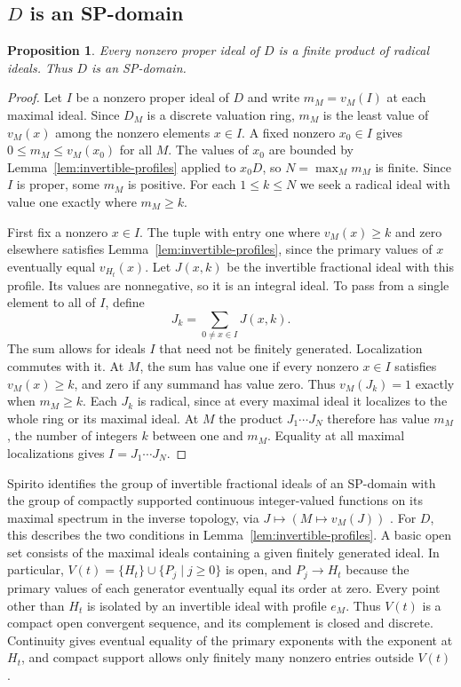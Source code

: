 \documentclass{article}
\newtheorem{proposition}{Proposition}[section]
\theoremstyle{remark}
\begin{document}
\subsection{$D$ is an SP-domain}

\begin{proposition}
    \label{prop:sp-domain}
    Every nonzero proper ideal of $D$ is a finite product of radical ideals.
    Thus $D$ is an SP-domain.
\end{proposition}

\begin{proof}
    Let $I$ be a nonzero proper ideal of $D$ and write $m_M = v_M(I)$ at each maximal ideal.
    Since $D_M$ is a discrete valuation ring, $m_M$ is the least value of $v_M(x)$ among the nonzero elements $x \in I$.
    A fixed nonzero $x_0 \in I$ gives $0 \le m_M \le v_M(x_0)$ for all $M$.
    The values of $x_0$ are bounded by Lemma~\ref{lem:invertible-profiles} applied to $x_0D$, so $N = \max_M m_M$ is finite.
    Since $I$ is proper, some $m_M$ is positive.
    For each $1 \le k \le N$ we seek a radical ideal with value one exactly where $m_M \ge k$.

    First fix a nonzero $x \in I$.
    The tuple with entry one where $v_M(x) \ge k$ and zero elsewhere satisfies Lemma~\ref{lem:invertible-profiles}, since the primary values of $x$ eventually equal $v_{H_t}(x)$.
    Let $J(x, k)$ be the invertible fractional ideal with this profile.
    Its values are nonnegative, so it is an integral ideal.
    To pass from a single element to all of $I$, define
    \[
        J_k = \sum_{0 \ne x \in I} J(x, k).
    \]
    The sum allows for ideals $I$ that need not be finitely generated.
    Localization commutes with it.
    At $M$, the sum has value one if every nonzero $x \in I$ satisfies $v_M(x) \ge k$, and zero if any summand has value zero.
    Thus $v_M(J_k) = 1$ exactly when $m_M \ge k$.
    Each $J_k$ is radical, since at every maximal ideal it localizes to the whole ring or its maximal ideal.
    At $M$ the product $J_1 \cdots J_N$ therefore has value $m_M$, the number of integers $k$ between one and $m_M$.
    Equality at all maximal localizations gives $I = J_1 \cdots J_N$.
\end{proof}

Spirito identifies the group of invertible fractional ideals of an SP-domain with the group of compactly supported continuous integer-valued functions on its maximal spectrum in the inverse topology, via $J \mapsto (M \mapsto v_M(J))$ \cite[Corollary~4.2]{SpiritoRadical}.
For $D$, this describes the two conditions in Lemma~\ref{lem:invertible-profiles}.
A basic open set consists of the maximal ideals containing a given finitely generated ideal.
In particular, $V(t) = \{H_t\} \cup \{P_j \mid j \ge 0\}$ is open, and $P_j \to H_t$ because the primary values of each generator eventually equal its order at zero.
Every point other than $H_t$ is isolated by an invertible ideal with profile $e_M$.
Thus $V(t)$ is a compact open convergent sequence, and its complement is closed and discrete.
Continuity gives eventual equality of the primary exponents with the exponent at $H_t$, and compact support allows only finitely many nonzero entries outside $V(t)$.
\end{document}
